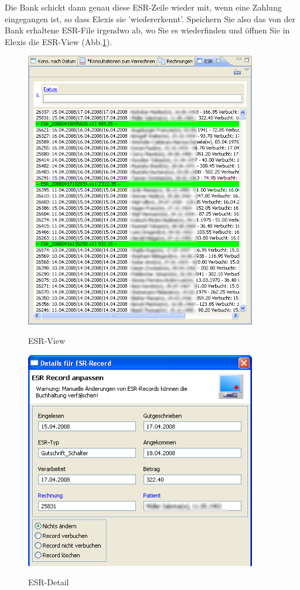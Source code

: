 \documentclass[a4paper]{scrartcl}
\begin{document}
Die Bank schickt dann genau diese ESR-Zeile wieder mit, wenn eine Zahlung eingegangen ist, so dass Elexis sie 'wiedererkennt'. Speichern Sie also das von der Bank erhaltene ESR-File irgendwo ab, wo Sie es wiederfinden und öffnen Sie in Elexis die ESR-View (Abb.\ref{fig:abr20}).
\begin{figure}
  \includegraphics[width=0.9\textwidth]{abr20}\\
  \caption{ESR-View}\label{fig:abr20}
\end{figure}
\begin{figure}
  \includegraphics[width=0.9\textwidth]{abr21}\\
  \caption{ESR-Detail}\label{fig:abr21}
\end{figure}
\end{document}
